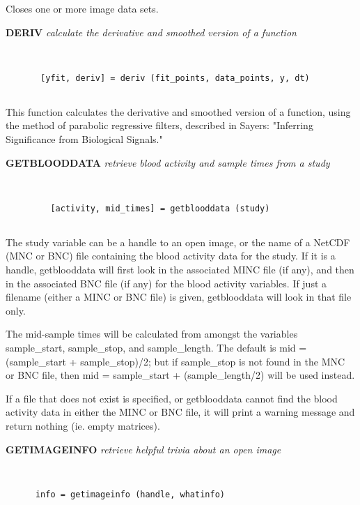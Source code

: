   Closes one or more image data sets.
\endfunchelp


{\large\bf DERIV} {\em  calculate the derivative and smoothed version of a function}
\begin{verbatim}


       [yfit, deriv] = deriv (fit_points, data_points, y, dt)


\end{verbatim}

   This function calculates the derivative and smoothed
   version of a function, using the method of parabolic
   regressive filters, described in Sayers: "Inferring
   Significance from Biological Signals."
 
\endfunchelp


{\large\bf GETBLOODDATA} {\em retrieve blood activity and sample times from a study}
\begin{verbatim}


         [activity, mid_times] = getblooddata (study)


\end{verbatim}

   The study variable can be a handle to an open image, or the name of 
   a NetCDF (MNC or BNC) file containing the blood activity data for
   the study.  If it is a handle, getblooddata will first look in the
   associated MINC file (if any), and then in the associated BNC file
   (if any) for the blood activity variables.  If just a filename
   (either a MINC or BNC file) is given, getblooddata will look in that
   file only.
  
   The mid-sample times will be calculated from amongst the variables
   sample\_start, sample\_stop, and sample\_length.  The default is
   mid = (sample\_start + sample\_stop)/2; but if sample\_stop is not
   found in the MNC or BNC file, then mid = sample\_start + (sample\_length/2)
   will be used instead.
 
   If a file that does not exist is specified, or getblooddata cannot
   find the blood activity data in either the MINC or BNC file, it will
   print a warning message and return nothing (ie. empty matrices).
\endfunchelp


{\large\bf GETIMAGEINFO} {\em   retrieve helpful trivia about an open image}
\begin{verbatim}


      info = getimageinfo (handle, whatinfo)


\end{verbatim}

